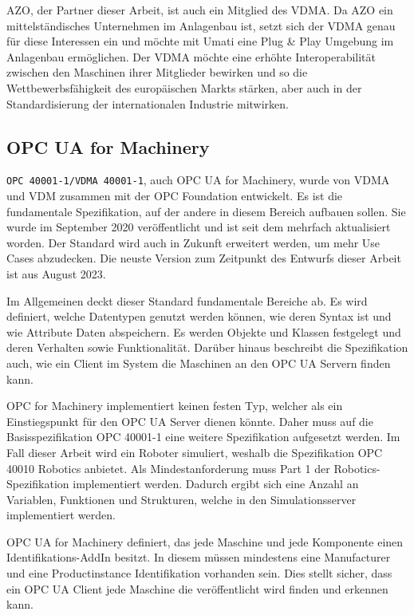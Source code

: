 \documentclass[a4paper, 12pt, oneside, toc=listofnumbered, bibliography=totoc]{scrbook}
\begin{document}
		AZO, der Partner dieser Arbeit, ist auch ein Mitglied des VDMA. Da AZO ein mittelständisches Unternehmen im Anlagenbau ist, setzt sich der VDMA genau für diese Interessen ein und möchte mit \ac{Umati} eine Plug \& Play Umgebung im Anlagenbau ermöglichen. Der VDMA möchte eine erhöhte Interoperabilität zwischen den Maschinen ihrer Mitglieder bewirken und so die Wettbewerbsfähigkeit des europäischen Markts stärken, aber auch in der Standardisierung der internationalen Industrie mitwirken. 
		
		\subsection{OPC UA for Machinery}
		
		\texttt{OPC 40001-1/VDMA 40001-1}, auch OPC UA for Machinery, wurde von VDMA und VDM zusammen mit der OPC Foundation entwickelt. Es ist die fundamentale Spezifikation, auf der andere in diesem Bereich aufbauen sollen. Sie wurde im September 2020 veröffentlicht und ist seit dem mehrfach aktualisiert worden. Der Standard wird auch in Zukunft erweitert werden, um mehr Use Cases abzudecken. Die neuste Version zum Zeitpunkt des Entwurfs dieser Arbeit ist aus August 2023.
		
		Im Allgemeinen deckt dieser Standard fundamentale Bereiche ab. Es wird definiert, welche Datentypen genutzt werden können, wie deren Syntax ist und wie Attribute Daten abspeichern. Es werden Objekte und Klassen festgelegt und deren Verhalten sowie Funktionalität. Darüber hinaus beschreibt die Spezifikation auch, wie ein Client im System die Maschinen an den OPC UA Servern finden kann. 
		
		OPC for Machinery implementiert keinen festen Typ, welcher als ein Einstiegspunkt für den OPC UA Server dienen könnte. Daher muss auf die Basisspezifikation OPC 40001-1 eine weitere Spezifikation aufgesetzt werden. Im Fall dieser Arbeit wird ein Roboter simuliert, weshalb die Spezifikation OPC 40010 Robotics anbietet. Als Mindestanforderung muss Part 1 der Robotics-Spezifikation implementiert werden. Dadurch ergibt sich eine Anzahl an Variablen, Funktionen und Strukturen, welche in den Simulationsserver implementiert werden.
		
		OPC UA for Machinery definiert, das jede Maschine und jede Komponente einen Identifikations-AddIn besitzt. In diesem müssen mindestens eine Manufacturer und eine Productinstance Identifikation vorhanden sein. Dies stellt sicher, dass ein OPC UA Client jede Maschine die veröffentlicht wird finden und erkennen kann.  
\end{document}

